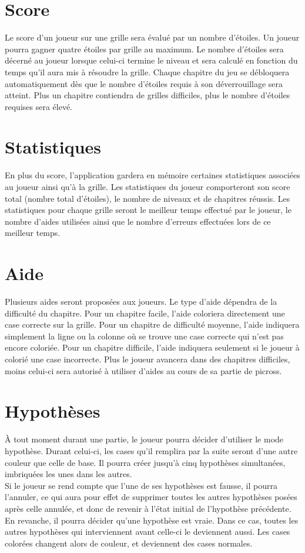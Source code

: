 \documentclass{report}
\begin{document}
		\section{Score}
			Le score d'un joueur sur une grille sera évalué par un nombre d'étoiles. Un joueur pourra gagner quatre étoiles par grille au maximum. Le nombre d'étoiles sera décerné au joueur lorsque celui-ci termine le niveau et sera calculé en fonction du temps qu'il aura mis à résoudre la grille. Chaque chapitre du jeu se débloquera automatiquement dès que le nombre d'étoiles requis à son déverrouillage sera atteint. Plus un chapitre contiendra de grilles difficiles, plus le nombre d'étoiles requises sera élevé.
				
		\section{Statistiques}
			En plus du score, l'application gardera en mémoire certaines statistiques associées au joueur ainsi qu'à la grille. Les statistiques du joueur comporteront son score total (nombre total d'étoiles), le nombre de niveaux et de chapitres réussis. Les statistiques pour chaque grille seront le meilleur temps effectué par le joueur, le nombre d'aides utilisées ainsi que le nombre d'erreurs effectuées lors de ce meilleur temps.
			
		\section{Aide}
			Plusieurs aides seront proposées aux joueurs. Le type d'aide dépendra de la difficulté du chapitre. Pour un chapitre facile, l'aide coloriera directement une case correcte sur la grille. Pour un chapitre de difficulté moyenne, l'aide indiquera simplement la ligne ou la colonne où se trouve une case correcte qui n'est pas encore coloriée. Pour un chapitre difficile, l'aide indiquera seulement si le joueur à colorié une case incorrecte. Plus le joueur avancera dans des chapitres difficiles, moins celui-ci sera autorisé à utiliser d'aides au cours de sa partie de picross.  

		\section{Hypothèses}			
			À tout moment durant une partie, le joueur pourra décider d'utiliser le mode hypothèse. Durant celui-ci, les cases qu'il remplira par la suite seront d'une autre couleur que celle de base. Il pourra créer jusqu'à cinq hypothèses simultanées, imbriquées les unes dans les autres.\\
			Si le joueur se rend compte que l'une de ses hypothèses est fausse, il pourra l'annuler, ce qui aura pour effet de supprimer toutes les autres hypothèses posées après celle annulée, et donc de revenir à l'état initial de l'hypothèse précédente.\\
			En revanche, il pourra décider qu'une hypothèse est vraie. Dans ce cas, toutes les autres hypothèses qui interviennent avant celle-ci le deviennent aussi. Les cases colorées changent alors de couleur, et deviennent des cases normales.
		
\end{document}
